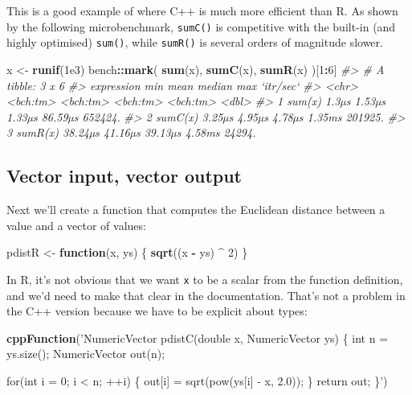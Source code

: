 \documentclass[]{book}
\newenvironment{Shaded}{\begin{snugshade}}{\end{snugshade}}
\newcommand{\CommentTok}[1]{\textcolor[rgb]{0.37,0.37,0.37}{\textit{#1}}}
\newcommand{\ControlFlowTok}[1]{\textcolor[rgb]{0.27,0.27,0.27}{\textbf{#1}}}
\newcommand{\DecValTok}[1]{\textcolor[rgb]{0.06,0.06,0.06}{#1}}
\newcommand{\FloatTok}[1]{\textcolor[rgb]{0.06,0.06,0.06}{#1}}
\newcommand{\KeywordTok}[1]{\textcolor[rgb]{0.27,0.27,0.27}{\textbf{#1}}}
\newcommand{\NormalTok}[1]{#1}
\newcommand{\OperatorTok}[1]{\textcolor[rgb]{0.43,0.43,0.43}{\textbf{#1}}}
\newcommand{\StringTok}[1]{\textcolor[rgb]{0.5,0.5,0.5}{#1}}
\begin{document}
This is a good example of where C++ is much more efficient than R. As shown by the following microbenchmark, \texttt{sumC()} is competitive with the built-in (and highly optimised) \texttt{sum()}, while \texttt{sumR()} is several orders of magnitude slower.

\begin{Shaded}
\begin{Highlighting}[]
\NormalTok{x <-}\StringTok{ }\KeywordTok{runif}\NormalTok{(}\FloatTok{1e3}\NormalTok{)}
\NormalTok{bench}\OperatorTok{::}\KeywordTok{mark}\NormalTok{(}
  \KeywordTok{sum}\NormalTok{(x),}
  \KeywordTok{sumC}\NormalTok{(x),}
  \KeywordTok{sumR}\NormalTok{(x)}
\NormalTok{)[}\DecValTok{1}\OperatorTok{:}\DecValTok{6}\NormalTok{]}
\CommentTok{#> # A tibble: 3 x 6}
\CommentTok{#>   expression      min     mean   median      max `itr/sec`}
\CommentTok{#>   <chr>      <bch:tm> <bch:tm> <bch:tm> <bch:tm>     <dbl>}
\CommentTok{#> 1 sum(x)        1.3µs   1.53µs   1.33µs  86.59µs   652424.}
\CommentTok{#> 2 sumC(x)      3.25µs   4.95µs   4.78µs   1.35ms   201925.}
\CommentTok{#> 3 sumR(x)     38.24µs  41.16µs  39.13µs   4.58ms    24294.}
\end{Highlighting}
\end{Shaded}

\hypertarget{vector-input-vector-output}{%
\subsection{Vector input, vector output}\label{vector-input-vector-output}}

Next we'll create a function that computes the Euclidean distance between a value and a vector of values:

\begin{Shaded}
\begin{Highlighting}[]
\NormalTok{pdistR <-}\StringTok{ }\ControlFlowTok{function}\NormalTok{(x, ys) \{}
  \KeywordTok{sqrt}\NormalTok{((x }\OperatorTok{-}\StringTok{ }\NormalTok{ys) }\OperatorTok{^}\StringTok{ }\DecValTok{2}\NormalTok{)}
\NormalTok{\}}
\end{Highlighting}
\end{Shaded}

In R, it's not obvious that we want \texttt{x} to be a scalar from the function definition, and we'd need to make that clear in the documentation. That's not a problem in the C++ version because we have to be explicit about types:

\begin{Shaded}
\begin{Highlighting}[]
\KeywordTok{cppFunction}\NormalTok{(}\StringTok{'NumericVector pdistC(double x, NumericVector ys) \{}
\StringTok{  int n = ys.size();}
\StringTok{  NumericVector out(n);}

\StringTok{  for(int i = 0; i < n; ++i) \{}
\StringTok{    out[i] = sqrt(pow(ys[i] - x, 2.0));}
\StringTok{  \}}
\StringTok{  return out;}
\StringTok{\}'}\NormalTok{)}
\end{Highlighting}
\end{Shaded}
\end{document}
